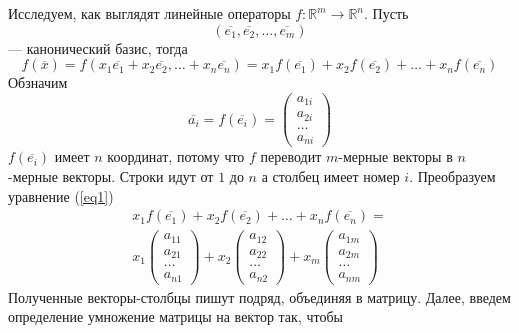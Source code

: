 \documentclass[]{article}
\theoremstyle{theorem}
\theoremstyle{definition}
\begin{document}
	Исследуем, как выглядят линейные операторы $f:\mathbb{R}^m\rightarrow\mathbb{R}^n$. Пусть $$(\overline{e_1}, \overline{e_2}, \ldots, \overline{e_m})$$ --- канонический базис, тогда 
		\begin{equation}\label{eq1}
			f(\overline{x})=
	f(x_1\overline{e_1}+ x_2\overline{e_2},\ldots+ x_n\overline{e_n})
	=
	x_1f(\overline{e_1})+ x_2f(\overline{e_2})+\ldots+ x_nf(\overline{e_n})
\end{equation}
	 Обзначим
	 \begin{equation}
	 	\overline{a_i}=
	 	f(\overline{e_i})=
	 	\begin{pmatrix}
	 		a_{1i}
	 		\\
	 		a_{2i}
	 		\\
	 		\ldots
	 		\\
			a_{ni}
	 	\end{pmatrix}
	 \end{equation}
	 $f(\overline{e_i})$ имеет $n$ координат, потому что $f$ переводит $m$-мерные векторы в $n$-мерные векторы. Строки идут от $1$ до $n$ а столбец имеет номер $i$. Преобразуем уравнение (\ref{eq1})
	 \begin{gather*}
	 	x_1f(\overline{e_1})+ x_2f(\overline{e_2})+\ldots+ x_nf(\overline{e_n})
	 	=
	 	\\
	 	x_1
	 	\begin{pmatrix}
	 		a_{11}
	 		\\
	 		a_{21}
	 		\\
	 		\ldots
	 		\\
	 		a_{n1}
	 	\end{pmatrix}
	 	+
	 	x_2
	 	\begin{pmatrix}
	 		a_{12}
	 		\\
	 		a_{22}
	 		\\
	 		\ldots
	 		\\
	 		a_{n2}
	 	\end{pmatrix}
	 	+
x_m
\begin{pmatrix}
	a_{1m}
	\\
	a_{2m}
	\\
	\ldots
	\\
	a_{nm}
\end{pmatrix}
	 \end{gather*}
	 Полученные векторы-столбцы пишут подряд, объединяя в матрицу. Далее, введем определение умножение матрицы на вектор так, чтобы 
\end{document}
